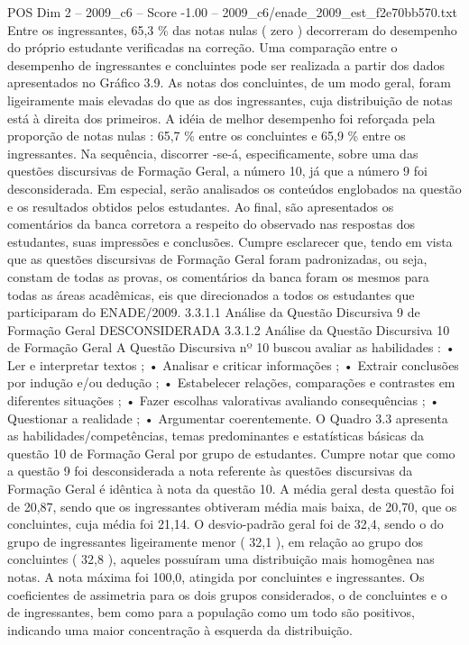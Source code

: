 \begin{textsample}{POS Dim 2 – 2009\_c6 – Score -1.00 – 2009\_c6/enade\_2009\_est\_f2e70bb570.txt}
Entre os ingressantes, 65,3 \% das notas nulas ( zero ) decorreram do desempenho do próprio estudante verificadas na correção.
Uma comparação entre o desempenho de ingressantes e concluintes pode ser realizada a partir dos dados apresentados no Gráfico 3.9.
As notas dos concluintes, de um modo geral, foram ligeiramente mais elevadas do que as dos ingressantes, cuja distribuição de notas está à direita dos primeiros.
A idéia de melhor desempenho foi reforçada pela proporção de notas nulas : 65,7 \% entre os concluintes e 65,9 \% entre os ingressantes.
Na sequência, discorrer -se-á, especificamente, sobre uma das questões discursivas de Formação Geral, a número 10, já que a número 9 foi desconsiderada.
Em especial, serão analisados os conteúdos englobados na questão e os resultados obtidos pelos estudantes.
Ao final, são apresentados os comentários da banca corretora a respeito do observado nas respostas dos estudantes, suas impressões e conclusões.
Cumpre esclarecer que, tendo em vista que as questões discursivas de Formação Geral foram padronizadas, ou seja, constam de todas as provas, os comentários da banca foram os mesmos para todas as áreas acadêmicas, eis que direcionados a todos os estudantes que participaram do ENADE/2009. 3.3.1.1 Análise da Questão Discursiva 9 de Formação Geral DESCONSIDERADA 3.3.1.2 Análise da Questão Discursiva 10 de Formação Geral A Questão Discursiva nº 10 buscou avaliar as habilidades : • Ler e interpretar textos ; • Analisar e criticar informações ; • Extrair conclusões por indução e/ou dedução ; • Estabelecer relações, comparações e contrastes em diferentes situações ; • Fazer escolhas valorativas avaliando consequências ; • Questionar a realidade ; • Argumentar coerentemente.
O Quadro 3.3 apresenta as habilidades/competências, temas predominantes e estatísticas básicas da questão 10 de Formação Geral por grupo de estudantes.
Cumpre notar que como a questão 9 foi desconsiderada a nota referente às questões discursivas da Formação Geral é idêntica à nota da questão 10.
A média geral desta questão foi de 20,87, sendo que os ingressantes obtiveram média mais baixa, de 20,70, que os concluintes, cuja média foi 21,14.
O desvio-padrão geral foi de 32,4, sendo o do grupo de ingressantes ligeiramente menor ( 32,1 ), em relação ao grupo dos concluintes ( 32,8 ), aqueles possuíram uma distribuição mais homogênea nas notas.
A nota máxima foi 100,0, atingida por concluintes e ingressantes.
Os coeficientes de assimetria para os dois grupos considerados, o de concluintes e o de ingressantes, bem como para a população como um todo são positivos, indicando uma maior concentração à esquerda da distribuição.

\end{textsample}
